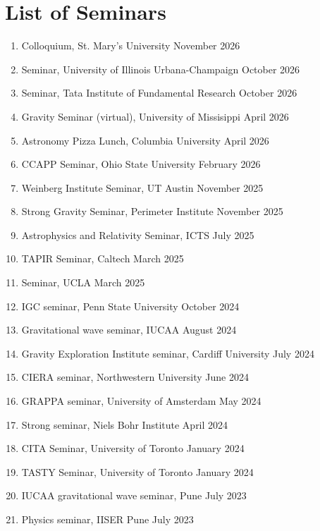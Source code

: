 		\section{List of Seminars}
		\begin{enumerate}[leftmargin=*, nosep]
			\item Colloquium, St. Mary's University \hfill November 2026
			\item Seminar, University of Illinois Urbana-Champaign \hfill October 2026
			\item Seminar, Tata Institute of Fundamental Research \hfill October 2026
			\item Gravity Seminar (virtual), University of Missisippi \hfill April 2026
			\item Astronomy Pizza Lunch, Columbia University \hfill April 2026
			\item CCAPP Seminar, Ohio State University \hfill February 2026
			\item Weinberg Institute Seminar, UT Austin \hfill November 2025
			\item Strong Gravity Seminar, Perimeter Institute \hfill November 2025
			\item Astrophysics and Relativity Seminar, ICTS \hfill July 2025
			\item TAPIR Seminar, Caltech  \hfill March 2025
			\item Seminar, UCLA \hfill March 2025
			\item IGC seminar, Penn State University \hfill October 2024
			\item Gravitational wave seminar, IUCAA \hfill August 2024
			\item Gravity Exploration Institute seminar, Cardiff University \hfill July 2024 
			\item CIERA seminar, Northwestern University \hfill June 2024 
			\item GRAPPA seminar, University of Amsterdam \hfill May 2024 
			\item Strong seminar, Niels Bohr Institute \hfill April 2024 
			\item CITA Seminar, University of Toronto \hfill January 2024
			\item TASTY Seminar, University of Toronto \hfill January 2024
			\item IUCAA gravitational wave seminar, Pune \hfill July 2023
			\item Physics seminar, IISER Pune \hfill July 2023

\end{enumerate}
